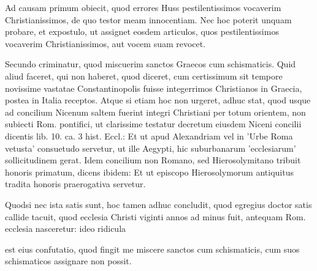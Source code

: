 Ad causam primum obiecit, quod errores Huss pestilentissimos vocaverim Christianissimos, de quo testor meam innocentiam. Nec hoc poterit unquam probare, et expostulo, ut assignet eosdem articulos, quos pestilentissimos vocaverim Christianissimos, aut vocem suam revocet.

Secundo criminatur, quod miscuerim sanctos Graecos cum schismaticis. Quid aliud faceret, qui non haberet, quod diceret, cum certissimum sit tempore novissime vastatae Constantinopolis fuisse integerrimos Christianos in Graecia, postea in Italia receptos. Atque si etiam hoc non urgeret, adhuc stat, quod usque ad concilium Nicenum saltem fuerint integri Christiani per totum orientem, non subiecti Rom. pontifici, ut clarissime testatur decretum eiusdem Niceni concilii dicentis lib. 10. ca. 3 hist. Eccl.: Et ut apud Alexandriam vel in 'Urbe Roma vetusta' consuetudo servetur, ut ille Aegypti, hic suburbanarum 'ecclesiarum' sollicitudinem gerat. Idem concilium non Romano, sed Hierosolymitano tribuit honoris primatum, dicens ibidem: Et ut episcopo Hierosolymorum antiquitus tradita honoris praerogativa servetur.

Quodsi nec ista satis sunt, hoc tamen adhuc concludit, quod egregius doctor satis callide tacuit, quod ecclesia Christi viginti annos ad minus fuit, antequam Rom. ecclesia nasceretur: ideo ridicula

est eius confutatio, quod fingit me miscere sanctos cum schismaticis, cum suos schismaticos assignare non possit.

